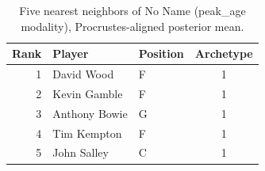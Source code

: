 \begin{table}[htbp]
  \centering\small
  \begin{tabular}{rllc}
    \toprule
    Rank & Player & Position & Archetype \\
    \midrule
    1 & David Wood & F & 1 \\
    2 & Kevin Gamble & F & 1 \\
    3 & Anthony Bowie & G & 1 \\
    4 & Tim Kempton & F & 1 \\
    5 & John Salley & C & 1 \\
    \bottomrule
  \end{tabular}
  \caption{Five nearest neighbors of No Name (peak_age modality), Procrustes-aligned posterior mean.}
  \label{tab:No_Name_neighbors_peak_age}
\end{table}


